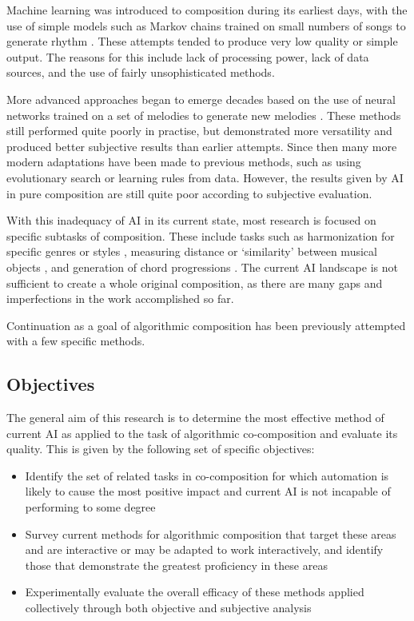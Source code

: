 \documentclass[11pt]{article}
\begin{document}
	Machine learning was introduced to composition during its earliest days, with the use of simple models such as Markov chains trained on small numbers of songs to generate rhythm \cite[]{pinkerton1956information}. These attempts tended to produce very low quality or simple output. The reasons for this include lack of processing power, lack of data sources, and the use of fairly unsophisticated methods. 
	
	More advanced approaches began to emerge decades based on the use of neural networks trained on a set of melodies to generate new melodies \cite[]{todd1989connectionist}. These methods still performed quite poorly in practise, but demonstrated more versatility and produced better subjective results than earlier attempts. Since then many more modern adaptations have been made to previous methods, such as using evolutionary search or learning rules from data. However, the results given by AI in pure composition are still quite poor according to subjective evaluation. 
	
	With this inadequacy of AI in its current state, most research is focused on specific subtasks of composition. These include tasks such as harmonization for specific genres or styles \cite{mcintyre1994bach}, measuring distance or `similarity' between musical objects \cite{horner1991genetic}, and generation of chord progressions \cite{chemillier2004toward}. The current AI landscape is not sufficient to create a whole original composition, as there are many gaps and imperfections in the work accomplished so far. 
	
	Continuation as a goal of algorithmic composition has been previously attempted with a few specific methods. 
	
	\subsection{Objectives}
	
	The general aim of this research is to determine the most effective method of current AI as applied to the task of algorithmic co-composition and evaluate its quality. This is given by the following set of specific objectives:
	 
	\begin{itemize}
		\item Identify the set of related tasks in co-composition for which automation is likely to cause the most positive impact and current AI is not incapable of performing to some degree
		\item Survey current methods for algorithmic composition that target these areas and are interactive or may be adapted to work interactively, and identify those that demonstrate the greatest proficiency in these areas
		\item Experimentally evaluate the overall efficacy of these methods applied collectively through both objective and subjective analysis
	\end{itemize}
	
\end{document}
